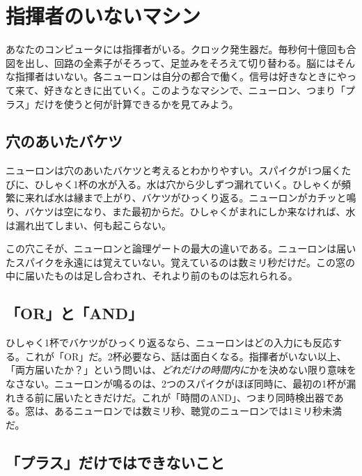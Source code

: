 \chapter{指揮者のいないマシン}

あなたのコンピュータには指揮者がいる。クロック発生器だ。毎秒何十億回も合図を出し、回路の全素子がそろって、足並みをそろえて切り替わる。脳にはそんな指揮者はいない。各ニューロンは自分の都合で働く。信号は好きなときにやって来て、好きなときに出ていく。このようなマシンで、ニューロン、つまり「プラス」だけを使うと何が計算できるかを見てみよう。

\section*{穴のあいたバケツ}

ニューロンは穴のあいたバケツと考えるとわかりやすい。スパイクが1つ届くたびに、ひしゃく1杯の水が入る。水は穴から少しずつ漏れていく。ひしゃくが頻繁に来れば水は縁まで上がり、バケツがひっくり返る。ニューロンがカチッと鳴り、バケツは空になり、また最初からだ。ひしゃくがまれにしか来なければ、水は漏れ出てしまい、何も起こらない。


この穴こそが、ニューロンと論理ゲートの最大の違いである。ニューロンは届いたスパイクを永遠には覚えていない。覚えているのは数ミリ秒だけだ。この窓の中に届いたものは足し合わされ、それより前のものは忘れられる。

\section*{「OR」と「AND」}

ひしゃく1杯でバケツがひっくり返るなら、ニューロンはどの入力にも反応する。これが「OR」だ。2杯必要なら、話は面白くなる。指揮者がいない以上、「両方届いたか？」という問いは、\emph{どれだけの時間内に}かを決めない限り意味をなさない。ニューロンが鳴るのは、2つのスパイクがほぼ同時に、最初の1杯が漏れきる前に届いたときだけだ。これが「時間のAND」、つまり同時検出器である。窓は、あるニューロンでは数ミリ秒、聴覚のニューロンでは1ミリ秒未満だ。

\section*{「プラス」だけではできないこと}

